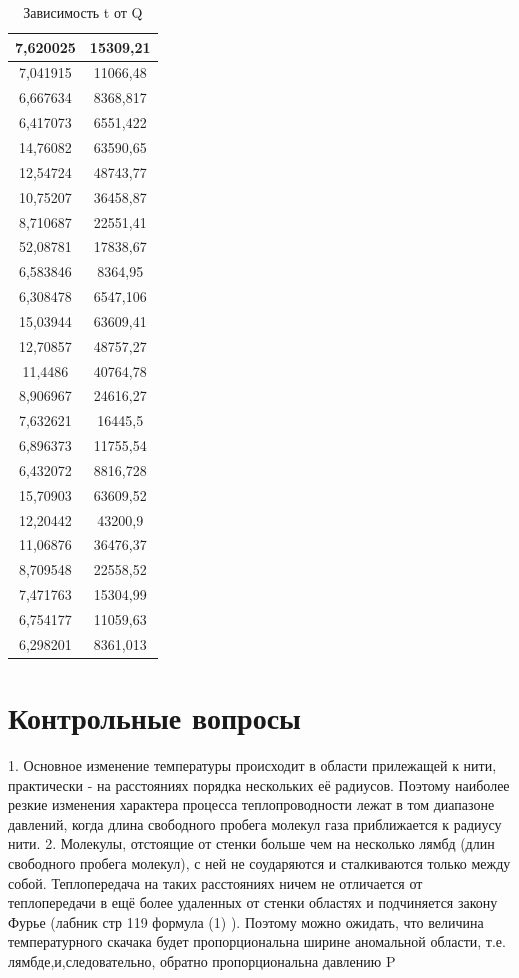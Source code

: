 \documentclass[a4paper]{article}
\begin{document}
\begin{table}
\begin{tabular}{| c | c |}
7,620025&	15309,21\\
    		\hline
7,041915&	11066,48\\
    		\hline
6,667634&	8368,817\\
    		\hline
6,417073&	6551,422\\
    		\hline
14,76082&	63590,65\\
    		\hline
12,54724&	48743,77\\
    		\hline
10,75207&	36458,87\\
    		\hline
8,710687&	22551,41\\
    		\hline
52,08781&	17838,67\\
    		\hline
6,583846&	8364,95\\
    		\hline
6,308478	&6547,106\\
    		\hline
15,03944&	63609,41\\
    		\hline
12,70857&	48757,27\\
    		\hline
11,4486&	40764,78\\
    		\hline
8,906967&	24616,27\\
    		\hline
7,632621&	16445,5\\
    		\hline
6,896373&	11755,54\\
    		\hline
6,432072&	8816,728\\
    		\hline
15,70903&	63609,52\\
    		\hline
12,20442	&43200,9\\
    		\hline
11,06876&	36476,37\\
    		\hline
8,709548	&22558,52\\
    		\hline
7,471763&	15304,99\\
    		\hline
6,754177&	11059,63\\
    		\hline
6,298201&	8361,013\\
    		\hline
    	\end{tabular}
    	\caption{Зависимость t от Q}
	\end{table}
	
	\section{Контрольные вопросы}
	1. Основное изменение температуры происходит в области прилежащей к нити, практически - на расстояниях порядка нескольких её радиусов. Поэтому наиболее резкие изменения характера процесса теплопроводности лежат в том диапазоне давлений, когда длина свободного пробега молекул газа приближается к радиусу нити.
	2. Молекулы, отстоящие от стенки больше чем на несколько лямбд (длин свободного пробега молекул), с ней не соударяются и сталкиваются только между собой. Теплопередача на таких расстояниях ничем не отличается от теплопередачи в ещё более удаленных от стенки областях и подчиняется закону Фурье (лабник стр 119 формула (1) ). Поэтому можно ожидать, что величина температурного скачака будет пропорциональна ширине аномальной области, т.е. лямбде,и,следовательно, обратно пропорциональна давлению P
\end{document}
